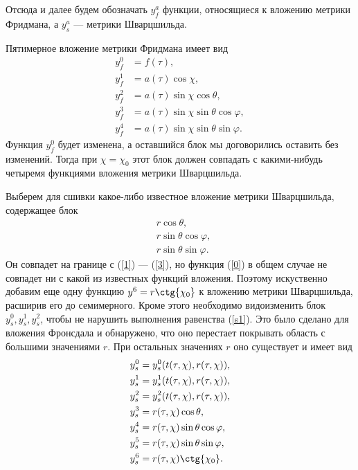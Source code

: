 \documentclass[12pt]{article}
\begin{document}
Отсюда и далее будем обозначать $y^a_f$ функции, относящиеся к вложению метрики Фридмана, а $y^a_s$ --- метрики Шварцшильда.

Пятимерное вложение метрики Фридмана имеет вид
\begin{align}
	y^0_f &= f(\tau), \\
\label{0}	y^1_f &= a(\tau) \cos{\chi}, \\
\label{1}	y^2_f &= a(\tau) \sin{\chi} \cos{\theta}, \\
\label{2}	y^3_f &= a(\tau) \sin{\chi} \sin{\theta} \cos{\varphi}, \\
\label{3}	y^4_f &= a(\tau) \sin{\chi} \sin{\theta} \sin{\varphi}.
\end{align}
Функция $y^0_f$ будет изменена, а оставшийся блок мы договорились оставить без изменений. Тогда при $\chi = \chi_0$ этот блок должен совпадать с какими-нибудь четыремя функциями вложения метрики Шварцшильда.

Выберем для сшивки какое-либо известное вложение метрики Шварцшильда, содержащее блок
\begin{align}
	&r \cos{\theta}, \\
	&r \sin{\theta} \cos{\varphi}, \\
	&r \sin{\theta} \sin{\varphi}.
\end{align}
Он совпадет на границе с (\ref{1}) --- (\ref{3}), но функция (\ref{0}) в общем случае не совпадет ни с какой из известных функций вложения. Поэтому искуственно добавим еще одну функцию $y^6 = r \ctg{\chi_0}$ к вложению метрики Шварцшильда, расширив его до семимерного. Кроме этого необходимо видоизменить блок $y^0_s, y^1_s, y^2_s$, чтобы не нарушить выполнения равенства (\ref{s1}). Это было сделано для вложения Фронсдала и обнаружено, что оно перестает покрывать область с большими значениями $r$. При остальных значениях $r$ оно существует и имеет вид
\begin{align}
\label{4}	&y^0_s = y^0_s(t(\tau, \chi), r(\tau, \chi)), \\
\label{5}	&y^1_s = y^1_s(t(\tau, \chi), r(\tau, \chi)), \\
\label{6}	&y^2_s = y^2_s(t(\tau, \chi), r(\tau, \chi)), \\
	&y^3_s = r(\tau, \chi) \cos{\theta}, \\
	&y^4_s = r(\tau, \chi) \sin{\theta} \cos{\varphi}, \\
	&y^5_s = r(\tau, \chi) \sin{\theta} \sin{\varphi}, \\
\label{7}	&y^6_s = r(\tau, \chi) \ctg{\chi_0}.
\end{align}
\end{document}
